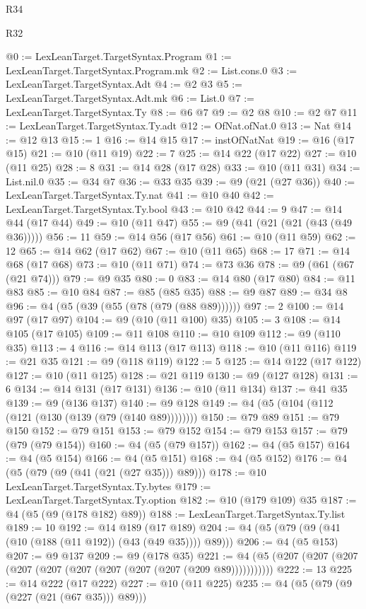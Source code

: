 \begin{lexlean}{R34}
\begin{lexlean}{R32}
\begin{coremodule}
{{{{{{{{{{{{{{{{{{{{{{{{{{{{{{{{{{{{{{{{{{{{{{{{{{{@0 := LexLeanTarget.TargetSyntax.Program
@1 := LexLeanTarget.TargetSyntax.Program.mk
@2 := List.cons.{0}
@3 := LexLeanTarget.TargetSyntax.Adt
@4 := @2 @3
@5 := LexLeanTarget.TargetSyntax.Adt.mk
@6 := List.{0}
@7 := LexLeanTarget.TargetSyntax.Ty
@8 := @6 @7
@9 := @2 @8
@10 := @2 @7
@11 := LexLeanTarget.TargetSyntax.Ty.adt
@12 := OfNat.ofNat.{0}
@13 := Nat
@14 := @12 @13
@15 := 1
@16 := @14 @15
@17 := instOfNatNat
@19 := @16 (@17 @15)
@21 := @10 (@11 @19)
@22 := 7
@25 := @14 @22 (@17 @22)
@27 := @10 (@11 @25)
@28 := 8
@31 := @14 @28 (@17 @28)
@33 := @10 (@11 @31)
@34 := List.nil.{0}
@35 := @34 @7
@36 := @33 @35
@39 := @9 (@21 (@27 @36))
@40 := LexLeanTarget.TargetSyntax.Ty.nat
@41 := @10 @40
@42 := LexLeanTarget.TargetSyntax.Ty.bool
@43 := @10 @42
@44 := 9
@47 := @14 @44 (@17 @44)
@49 := @10 (@11 @47)
@55 := @9 (@41 (@21 (@21 (@43 (@49 @36)))))
@56 := 11
@59 := @14 @56 (@17 @56)
@61 := @10 (@11 @59)
@62 := 12
@65 := @14 @62 (@17 @62)
@67 := @10 (@11 @65)
@68 := 17
@71 := @14 @68 (@17 @68)
@73 := @10 (@11 @71)
@74 := @73 @36
@78 := @9 (@61 (@67 (@21 @74)))
@79 := @9 @35
@80 := 0
@83 := @14 @80 (@17 @80)
@84 := @11 @83
@85 := @10 @84
@87 := @85 (@85 @35)
@88 := @9 @87
@89 := @34 @8
@96 := @4 (@5 (@39 (@55 (@78 (@79 (@88 @89))))))
@97 := 2
@100 := @14 @97 (@17 @97)
@104 := @9 (@10 (@11 @100) @35)
@105 := 3
@108 := @14 @105 (@17 @105)
@109 := @11 @108
@110 := @10 @109
@112 := @9 (@110 @35)
@113 := 4
@116 := @14 @113 (@17 @113)
@118 := @10 (@11 @116)
@119 := @21 @35
@121 := @9 (@118 @119)
@122 := 5
@125 := @14 @122 (@17 @122)
@127 := @10 (@11 @125)
@128 := @21 @119
@130 := @9 (@127 @128)
@131 := 6
@134 := @14 @131 (@17 @131)
@136 := @10 (@11 @134)
@137 := @41 @35
@139 := @9 (@136 @137)
@140 := @9 @128
@149 := @4 (@5 (@104 (@112 (@121 (@130 (@139 (@79 (@140 @89))))))))
@150 := @79 @89
@151 := @79 @150
@152 := @79 @151
@153 := @79 @152
@154 := @79 @153
@157 := @79 (@79 (@79 @154))
@160 := @4 (@5 (@79 @157))
@162 := @4 (@5 @157)
@164 := @4 (@5 @154)
@166 := @4 (@5 @151)
@168 := @4 (@5 @152)
@176 := @4 (@5 (@79 (@9 (@41 (@21 (@27 @35))) @89)))
@178 := @10 LexLeanTarget.TargetSyntax.Ty.bytes
@179 := LexLeanTarget.TargetSyntax.Ty.option
@182 := @10 (@179 @109) @35
@187 := @4 (@5 (@9 (@178 @182) @89))
@188 := LexLeanTarget.TargetSyntax.Ty.list
@189 := 10
@192 := @14 @189 (@17 @189)
@204 := @4 (@5 (@79 (@9 (@41 (@10 (@188 (@11 @192)) (@43 (@49 @35)))) @89)))
@206 := @4 (@5 @153)
@207 := @9 @137
@209 := @9 (@178 @35)
@221 := @4 (@5 (@207 (@207 (@207 (@207 (@207 (@207 (@207 (@207 (@207 (@209 @89)))))))))))
@222 := 13
@225 := @14 @222 (@17 @222)
@227 := @10 (@11 @225)
@235 := @4 (@5 (@79 (@9 (@227 (@21 (@67 @35))) @89)))
}}}}}}}}}}}}}}}}}}}}}}}}}}}}}}}}}}}}}}}}}}}}}}}}}}}
\end{coremodule}
\end{lexlean}
\end{lexlean}
